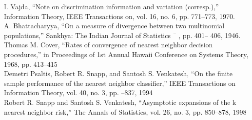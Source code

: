 \documentclass{article}
\begin{document}
	\noindent [32] I. Vajda, “Note on discrimination information and variation (corresp.),”	Information Theory, IEEE 
	\indent Transactions on, vol. 16, no. 6, pp. 771–773, 1970.
	\\ [0.5ex]
	
	\noindent [33] A. Bhattacharyya, “On a measure of divergence between two multinomial populations,” Sankhya: 
	\indent The Indian Journal of Statistics ¯ , pp. 401–
	406, 1946.
	\\[0.5 ex]
	
	\noindent [34] Thomas M. Cover, “Rates of convergence of nearest
	neighbor decision procedures,” in Proceedings \indent of 1st
	Annual Hawaii Conference on Systems Theory, 1968,
	pp. 413–415
	\indent
	\\[0.5ex]
	
	\noindent [35] Demetri Psaltis, Robert R. Snapp, and Santosh S.
	Venkatesh, “On the finite sample performance \indent of the
	nearest neighbor classifier,” IEEE Transactions on Information
	Theory, vol. 40, no. 3, pp. –837, 1994
	\\[0.5ex]
	
	\noindent [36] Robert R. Snapp and Santosh S. Venkatesh, “Asymptotic
	expansions of the k nearest neighbor \indent risk,” The
	Annals of Statistics, vol. 26, no. 3, pp. 850–878, 1998
	\\[0.5ex]
	
\end{document}

